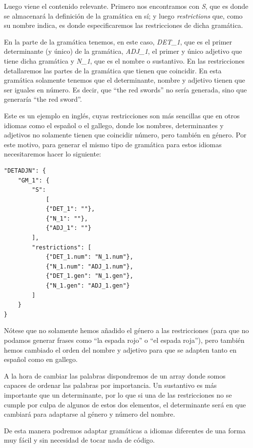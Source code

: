 Luego viene el contenido relevante. Primero nos encontramos con \textit{S}, que es donde se almacenará la definición de la gramática en sí; y luego \textit{restrictions} que, como su nombre indica, es donde especificaremos las restricciones de dicha gramática.

En la parte de la gramática tenemos, en este caso, \textit{DET\_1}, que es el primer determinante (y único) de la gramática, \textit{ADJ\_1}, el primer y único adjetivo que tiene dicha gramática y \textit{N\_1}, que es el nombre o sustantivo.
En las restricciones detallaremos las partes de la gramática que tienen que coincidir. En esta gramática solamente tenemos que el determinante, nombre y adjetivo tienen que ser iguales en número. Es decir, que ``the red swords'' no sería generada, sino que generaría ``the red sword''.

Este es un ejemplo en inglés, cuyas restricciones son más sencillas que en otros idiomas como el español o el gallego, donde los nombres, determinantes y adjetivos no solamente tienen que coincidir número, pero también en género. Por este motivo, para generar el mismo tipo de gramática para estos idiomas necesitaremos hacer lo siguiente:

\begin{lstlisting}[style=json]
"DETADJN": {
    "GM_1": {
        "S": 
            [
            {"DET_1": ""},
            {"N_1": ""},
            {"ADJ_1": ""}
        ],
        "restrictions": [
            {"DET_1.num": "N_1.num"},
            {"N_1.num": "ADJ_1.num"},
            {"DET_1.gen": "N_1.gen"},
            {"N_1.gen": "ADJ_1.gen"}
        ]
    }
}
\end{lstlisting}

Nótese que no solamente hemos añadido el género a las restricciones (para que no podamos generar frases como ``la espada rojo'' o ``el espada roja''), pero también hemos cambiado el orden del nombre y adjetivo para que se adapten tanto en español como en gallego. 

A la hora de cambiar las palabras dispondremos de un array donde somos capaces de ordenar las palabras por importancia. Un sustantivo es más importante que un determinante, por lo que si una de las restricciones no se cumple por culpa de algunos de estos dos elementos, el determinante será en que cambiará para adaptarse al género y número del nombre.

De esta manera podremos adaptar gramáticas a idiomas diferentes de una forma muy fácil y sin necesidad de tocar nada de código.

